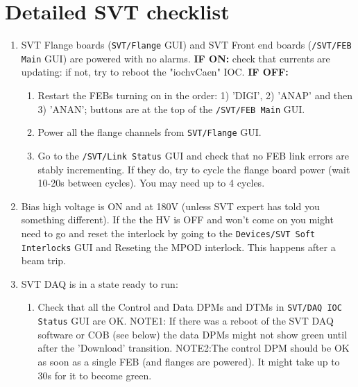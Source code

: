 \documentclass[12pt]{article}
\begin{document}
    
   
\section{Detailed SVT checklist}

\begin{enumerate}
\item 
SVT Flange boards (\texttt{SVT/Flange} GUI) and SVT Front end boards (\texttt{/SVT/FEB Main} GUI) are powered  with no alarms. 
\newline
{\bf IF ON:} check that currents are updating: if not, try to reboot the "iochvCaen" IOC.
\newline
{\bf IF OFF:} 
\begin{enumerate}
\item 
Restart the FEBs turning on in the order: 1) 'DIGI', 2) 'ANAP' and then 3) 'ANAN'; buttons are at the top of the \texttt{/SVT/FEB Main} GUI.
\item
Power all the flange channels from   \texttt{SVT/Flange}  GUI. 
\item 
Go to the \texttt{/SVT/Link Status} GUI and check that no FEB link errors are stably incrementing. If they do, try to cycle the flange board power (wait 10-20s between cycles). You may need up to 4 cycles.
\end{enumerate}
\item 
Bias high voltage is ON and at 180V (unless SVT expert has told you something different). 
\newline If the the HV is OFF and won't come on you might need to go and reset the interlock by going to the \texttt{Devices/SVT Soft Interlocks} GUI and Reseting the MPOD interlock. This happens after a beam trip. 
\newline {\bf \textcolor{red}{Important: Check that beam conditions for turning on bias voltage is OK before swiching on (see above)!}}

\item
SVT DAQ is in a state ready to run:
\begin{enumerate}
\item
Check that all the Control and Data DPMs and DTMs in \texttt{SVT/DAQ IOC Status} GUI are OK. 
\newline NOTE1: If there was a reboot of the SVT DAQ software or COB (see below) the data DPMs might not show green until after the 'Download' transition. 
\newline NOTE2:The control DPM should be OK as soon as a single FEB (and flanges are powered). It might take up to 30s for it to become green.


\end{enumerate}
\end{enumerate}
\end{document}
